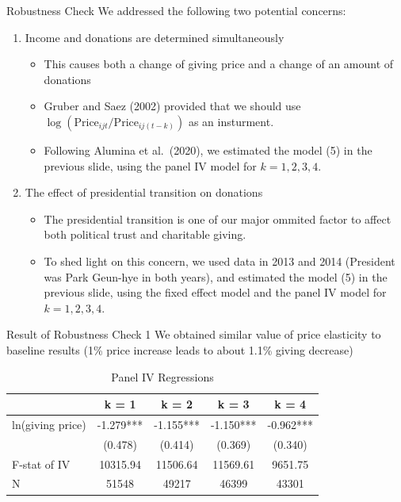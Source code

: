 \documentclass[
  ignorenonframetext,
]{beamer}
\providecommand{\tightlist}{%
  \setlength{\itemsep}{0pt}\setlength{\parskip}{0pt}}
\begin{document}
\begin{frame}{Robustness Check}
\protect\hypertarget{robustness-check}{}
We addressed the following two potential concerns:

\begin{enumerate}
\tightlist
\item
  Income and donations are determined simultaneously

  \begin{itemize}
  \tightlist
  \item
    This causes both a change of giving price and a change of an amount of donations
  \item
    Gruber and Saez (2002) provided that we should use \(\log(\text{Price}_{ijt}/\text{Price}_{ij(t-k)})\) as an insturment.
  \item
    Following Alumina et al.~(2020), we estimated the model (5) in the previous slide, using the panel IV model for \(k = 1, 2, 3, 4\).
  \end{itemize}
\item
  The effect of presidential transition on donations

  \begin{itemize}
  \tightlist
  \item
    The presidential transition is one of our major ommited factor to affect both political trust and charitable giving.
  \item
    To shed light on this concern, we used data in 2013 and 2014 (President was Park Geun-hye in both years), and estimated the model (5) in the previous slide, using the fixed effect model and the panel IV model for \(k = 1, 2, 3, 4\).
  \end{itemize}
\end{enumerate}
\end{frame}

\begin{frame}{Result of Robustness Check 1}
\protect\hypertarget{result-of-robustness-check-1}{}
We obtained similar value of price elasticity to baseline results (1\% price increase leads to about 1.1\% giving decrease)

\begin{table}

\caption{\label{tab:kableRobust1EstimateElasticity}Panel IV Regressions}
\centering
\begin{tabular}[t]{lcccc}
\toprule
 & k = 1 & k = 2 & k = 3 & k = 4\\
\midrule
ln(giving price) & -1.279*** & -1.155*** & -1.150*** & -0.962***\\
 & (0.478) & (0.414) & (0.369) & (0.340)\\
F-stat of IV & 10315.94 & 11506.64 & 11569.61 & 9651.75\\
N & 51548 & 49217 & 46399 & 43301\\
\bottomrule
\end{tabular}
\end{table}
\end{frame}
\end{document}
